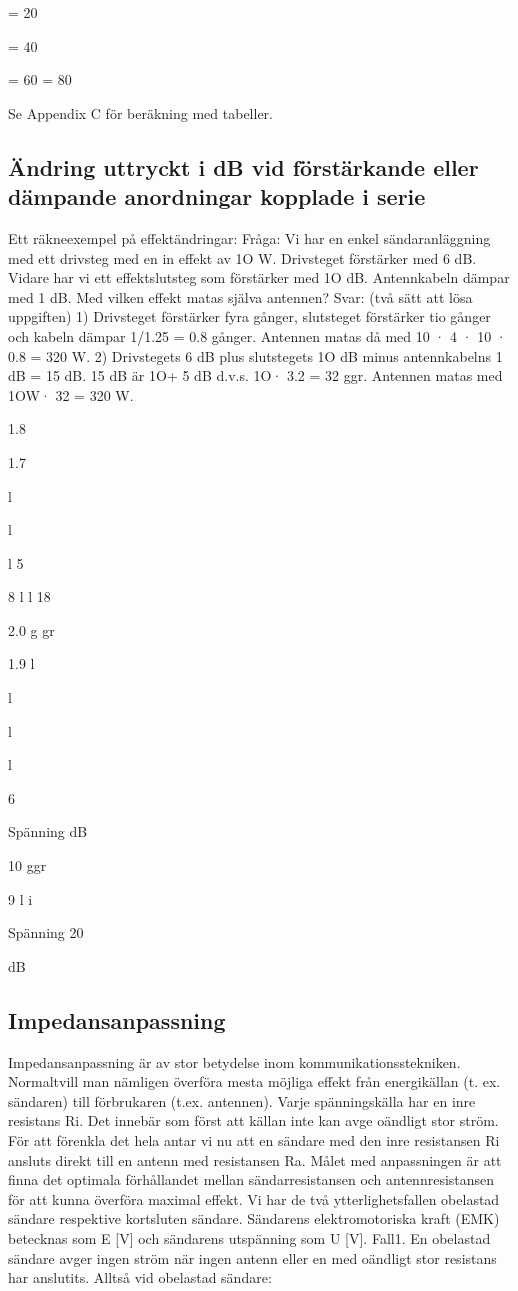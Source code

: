 {{= 20

= 40

= 60
= 80

Se Appendix C för beräkning med tabeller.

\subsection{Ändring uttryckt i dB vid förstärkande eller
dämpande anordningar kopplade i serie}

Ett räkneexempel på effektändringar:
Fråga:
Vi har en enkel sändaranläggning med
ett drivsteg med en in effekt av 1O W. Drivsteget förstärker med 6 dB. Vidare har vi ett
effektslutsteg som förstärker med 1O dB.
Antennkabeln dämpar med 1 dB.
Med vilken effekt matas själva antennen?
Svar: (två sätt att lösa uppgiften)
1) Drivsteget förstärker fyra gånger, slutsteget förstärker tio gånger och kabeln
dämpar 1/1.25 = 0.8 gånger. Antennen
matas då med 10 · 4 · 10 · 0.8 = 320 W.
2) Drivstegets 6 dB plus slutstegets 1O dB
minus antennkabelns 1 dB = 15 dB.
15 dB är 1O+ 5 dB d.v.s. 1O· 3.2 = 32 ggr.
Antennen matas med 1OW· 32 = 320 W.

1.8

1.7

l

l

l
5

8
l
l
18

2.0 g gr

1.9
l

l

l

l

6

Spänning
dB

10 ggr

9
l
i

Spänning
20

dB

\subsection{Impedansanpassning}
Impedansanpassning är av stor betydelse
inom kommunikationsstekniken. Normaltvill
man nämligen överföra mesta möjliga effekt
från energikällan (t. ex. sändaren) till förbrukaren (t.ex. antennen).
Varje spänningskälla har en inre resistans Ri. Det innebär som först att källan inte
kan avge oändligt stor ström. För att förenkla
det hela antar vi nu att en sändare med den
inre resistansen Ri ansluts direkt till en antenn med resistansen Ra.
Målet med anpassningen är att finna det
optimala förhållandet mellan sändarresistansen och antennresistansen för att kunna
överföra maximal effekt. Vi har de två ytterlighetsfallen obelastad sändare respektive
kortsluten sändare. Sändarens elektromotoriska kraft (EMK) betecknas som E [V]
och sändarens utspänning som U [V].
Fall1.
En obelastad sändare avger ingen ström när
ingen antenn eller en med oändligt stor resistans har anslutits.
Alltså vid obelastad sändare:

}}
